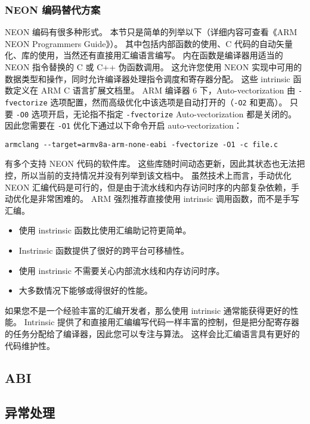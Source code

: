 \subsubsection{NEON 编码替代方案}

NEON 编码有很多种形式。
本节只是简单的列举以下（详细内容可查看《ARM NEON Programmers Guide》）。
其中包括内部函数的使用、C 代码的自动矢量化、库的使用，当然还有直接用汇编语言编写。
内在函数是编译器用适当的 NEON 指令替换的 C 或 C++ 伪函数调用。
这允许您使用 NEON 实现中可用的数据类型和操作，同时允许编译器处理指令调度和寄存器分配。
这些 intrinsic 函数定义在 ARM C 语言扩展文档里。
ARM 编译器 6 下，Auto-vectorization 由 \lstinline!-fvectorize! 选项配置，然而高级优化中该选项是自动打开的（\lstinline!-O2! 和更高）。
只要 \lstinline!-O0! 选项开启，无论指不指定 \lstinline!-fvectorize! Auto-vectorization 都是关闭的。
因此您需要在 \lstinline!-O1! 优化下通过以下命令开启 auto-vectorization：

\lstinline!armclang --target=armv8a-arm-none-eabi -fvectorize -O1 -c file.c!

有多个支持 NEON 代码的软件库。
这些库随时间动态更新，因此其状态也无法把控，所以当前的支持情况并没有列举到该文档中。
虽然技术上而言，手动优化 NEON 汇编代码是可行的，但是由于流水线和内存访问时序的内部复杂依赖，手动优化是非常困难的。
ARM 强烈推荐直接使用 intrinsic 调用函数，而不是手写汇编。

\begin{itemize}
  \item 使用 instrinsic 函数比使用汇编助记符更简单。
  \item Instrinsic 函数提供了很好的跨平台可移植性。
  \item 使用 instrinsic 不需要关心内部流水线和内存访问时序。
  \item 大多数情况下能够或得很好的性能。
\end{itemize}

如果您不是一个经验丰富的汇编开发者，那么使用 intrinsic 通常能获得更好的性能。
Intrinsic 提供了和直接用汇编编写代码一样丰富的控制，但是把分配寄存器的任务分配给了编译器，因此您可以专注与算法。
这样会比汇编语言具有更好的代码维护性。

\subsection{ABI}

\subsection{异常处理} \label{sec:exception}

